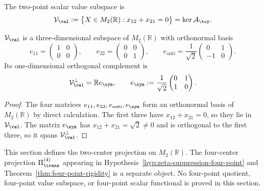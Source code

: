 \begin{definition}
\label{def:value-subspace}
The two-point scalar value subspace is
\begin{equation}
\label{eq:V-val}
        \mathcal V_\val
        :=\bigl\{X\in M_{2}(\mathbb R):x_{12}+x_{21}=0\bigr\}
        =\ker\mathcal A_\toy.
\end{equation}
\end{definition}

\begin{lemma}
\label{lem:value-subspace-explicit-basis}
\(\mathcal V_\val\) is a three-dimensional subspace of \(M_2(\mathbb R)\)
with orthonormal basis
\begin{equation}
\label{eq:V-val-basis}
        e_{11}=\begin{pmatrix}1&0\\0&0\end{pmatrix},
        \qquad
        e_{22}=\begin{pmatrix}0&0\\0&1\end{pmatrix},
        \qquad
        e_{\mathrm{anti}}=\frac1{\sqrt2}
        \begin{pmatrix}0&1\\-1&0\end{pmatrix}.
\end{equation}
Its one-dimensional orthogonal complement is
\begin{equation}
\label{eq:V-val-perp-basis}
        \mathcal V_\val^\perp=\mathbb R e_\sym,
        \qquad
        e_\sym:=\frac1{\sqrt2}
        \begin{pmatrix}0&1\\1&0\end{pmatrix}.
\end{equation}
\end{lemma}

\begin{proof}
The four matrices \(e_{11},e_{22},e_{\mathrm{anti}},e_\sym\) form an
orthonormal basis of \(M_2(\mathbb R)\) by direct calculation.  The first
three have \(x_{12}+x_{21}=0\), so they lie in \(\mathcal V_\val\).
The matrix \(e_\sym\) has \(x_{12}+x_{21}=\sqrt2\ne0\) and is orthogonal
to the first three, so it spans \(\mathcal V_\val^\perp\).
\end{proof}

\begin{remark}
\label{rem:transverse-projection-four-point-not-supplied}
This section defines the two-center projection on \(M_2(\mathbb R)\).
The four-center projection \(\Pi_\trans^{(4)}\) appearing in
Hypothesis~\ref{hyp:zeta-suppression-four-point} and
Theorem~\ref{thm:four-point-rigidity} is a separate object.  No
four-point quotient, four-point value subspace, or four-point scalar
functional is proved in this section.
\end{remark}

